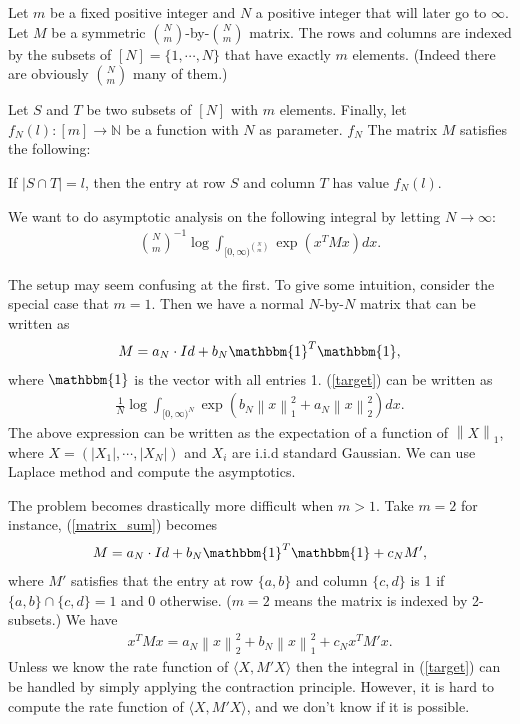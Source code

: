 \documentclass[10pt]{article}
\author{Yi Gu}
\newcommand{\norm}[1]{\left\lVert#1\right\rVert}
\newenvironment{Proof of lemma}{\noindent{\bf Proof of Lemma}}{\hfill$\Box$\newline}
\newenvironment{Proof of claim}{\noindent{\bf Proof of claim}}{\hfill$\Box$\newline}
\newenvironment{Proof of theorem}{\noindent{\bf Proof of Theorem}}{\hfill\scriptsize{$\Box$}\newline}
\newenvironment{Proof of theorems}{\noindent{\bf Proof of Theorems}}{\hfill$\Box$\newline}
\newenvironment{Proof of proposition}{\noindent{\bf Proof of Proposition}}{\hfill$\Box$\newline}
\newenvironment{Proof of propositions}{\noindent{\bf Proof of Propositions}}{\hfill$\Box$\newline}
\newenvironment{Proof of exercise}{\noindent{\it Proof of Exercise:}}{\hfill$\Box$}
\begin{document}
Let $m$ be a fixed positive integer and $N$ a positive integer that will later go to $\infty$. Let $M$ be a symmetric $\binom{N}{m}$-by-$\binom{N}{m}$ matrix. The rows and columns are indexed by the subsets of $[N] = \{1, \cdots, N\}$ that have exactly $m$ elements. (Indeed there are obviously $\binom{N}{m}$ many of them.) 


Let $S$ and $T$ be two subsets of $[N]$ with $m$ elements. Finally, let $f_N(l): [m] \to \mathbb{N}$ be a function with $N$ as parameter. $f_N$ The matrix $M$ satisfies the following:

If $|S \cap T| = l$, then the entry at row $S$ and column $T$ has value $f_N(l)$.

We want to do asymptotic analysis on the following integral by letting $N \to \infty$:
\begin{align} \label{target}
    \binom{N}{m}^{-1}\log \int_{[0,\infty)^{\binom{N}{m}}} \exp \left(x^T M x\right)dx.
\end{align}

The setup may seem confusing at the first. To give some intuition, consider the special case that $m =1$. Then we have a normal $N$-by-$N$ matrix that can be written as
\begin{align} \label{matrix_sum}
    M = a_N\cdot Id + b_N \mathbbm{1}^T\mathbbm{1},
\end{align}
where $\mathbbm{1}$ is the vector with all entries 1. (\ref{target}) can be written as
\begin{align}
    \frac{1}{N}\log \int_{[0,\infty)^N} \exp \left(b_N \norm{x}_1^2 + a_N\norm{x}_2^2\right) dx.
\end{align}
The above expression can be written as the expectation of a function of $\norm{X}_1$, where $X = (|X_1|,\cdots,|X_N|)$ and $X_i$ are i.i.d standard Gaussian. We can use Laplace method and compute the asymptotics.

The problem becomes drastically more difficult when $m>1$. Take $m=2$ for instance, (\ref{matrix_sum}) becomes
\begin{align} 
    M = a_N\cdot Id + b_N \mathbbm{1}^T\mathbbm{1} + c_NM',
\end{align}
where $M'$ satisfies that the entry at row $\{a,b\}$ and column $\{c,d\}$ is 1 if $\{a,b\} \cap \{c,d\} = 1$ and 0 otherwise. ($m=2$ means the matrix is indexed by 2-subsets.) We have
\begin{align}
    x^TMx = a_N\norm{x}_2^2 + b_N \norm{x}_1^2 + c_Nx^TM'x.
\end{align}
Unless we know the rate function of $\langle X, M'X \rangle$ then the integral in (\ref{target}) can be handled by simply applying the contraction principle. However, it is hard to compute the rate function of $\langle X, M'X \rangle$, and we don't know if it is possible.
\end{document}
